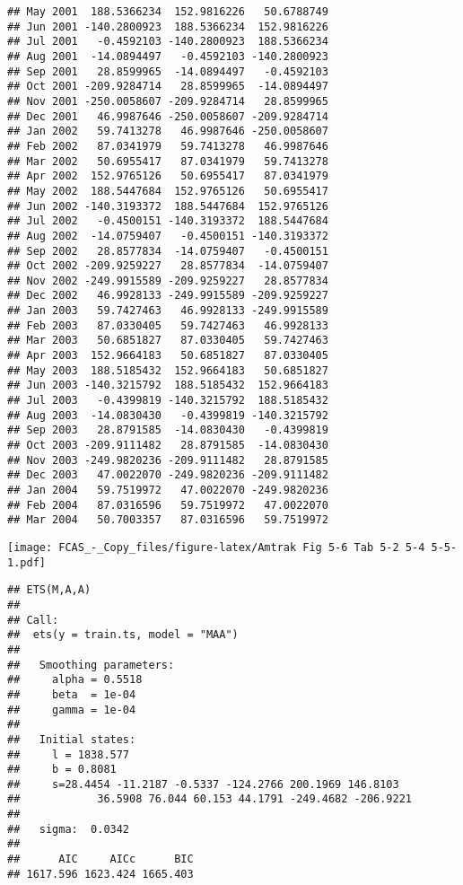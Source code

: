 \documentclass[]{article}
\begin{document}
\begin{verbatim}
## May 2001  188.5366234  152.9816226   50.6788749
## Jun 2001 -140.2800923  188.5366234  152.9816226
## Jul 2001   -0.4592103 -140.2800923  188.5366234
## Aug 2001  -14.0894497   -0.4592103 -140.2800923
## Sep 2001   28.8599965  -14.0894497   -0.4592103
## Oct 2001 -209.9284714   28.8599965  -14.0894497
## Nov 2001 -250.0058607 -209.9284714   28.8599965
## Dec 2001   46.9987646 -250.0058607 -209.9284714
## Jan 2002   59.7413278   46.9987646 -250.0058607
## Feb 2002   87.0341979   59.7413278   46.9987646
## Mar 2002   50.6955417   87.0341979   59.7413278
## Apr 2002  152.9765126   50.6955417   87.0341979
## May 2002  188.5447684  152.9765126   50.6955417
## Jun 2002 -140.3193372  188.5447684  152.9765126
## Jul 2002   -0.4500151 -140.3193372  188.5447684
## Aug 2002  -14.0759407   -0.4500151 -140.3193372
## Sep 2002   28.8577834  -14.0759407   -0.4500151
## Oct 2002 -209.9259227   28.8577834  -14.0759407
## Nov 2002 -249.9915589 -209.9259227   28.8577834
## Dec 2002   46.9928133 -249.9915589 -209.9259227
## Jan 2003   59.7427463   46.9928133 -249.9915589
## Feb 2003   87.0330405   59.7427463   46.9928133
## Mar 2003   50.6851827   87.0330405   59.7427463
## Apr 2003  152.9664183   50.6851827   87.0330405
## May 2003  188.5185432  152.9664183   50.6851827
## Jun 2003 -140.3215792  188.5185432  152.9664183
## Jul 2003   -0.4399819 -140.3215792  188.5185432
## Aug 2003  -14.0830430   -0.4399819 -140.3215792
## Sep 2003   28.8791585  -14.0830430   -0.4399819
## Oct 2003 -209.9111482   28.8791585  -14.0830430
## Nov 2003 -249.9820236 -209.9111482   28.8791585
## Dec 2003   47.0022070 -249.9820236 -209.9111482
## Jan 2004   59.7519972   47.0022070 -249.9820236
## Feb 2004   87.0316596   59.7519972   47.0022070
## Mar 2004   50.7003357   87.0316596   59.7519972
\end{verbatim}

\texttt{[image: FCAS\_-\_Copy\_files/figure-latex/Amtrak Fig 5-6 Tab 5-2 5-4 5-5-1.pdf]}

\begin{verbatim}
## ETS(M,A,A) 
## 
## Call:
##  ets(y = train.ts, model = "MAA") 
## 
##   Smoothing parameters:
##     alpha = 0.5518 
##     beta  = 1e-04 
##     gamma = 1e-04 
## 
##   Initial states:
##     l = 1838.577 
##     b = 0.8081 
##     s=28.4454 -11.2187 -0.5337 -124.2766 200.1969 146.8103
##            36.5908 76.044 60.153 44.1791 -249.4682 -206.9221
## 
##   sigma:  0.0342
## 
##      AIC     AICc      BIC 
## 1617.596 1623.424 1665.403
\end{verbatim}
\end{document}
